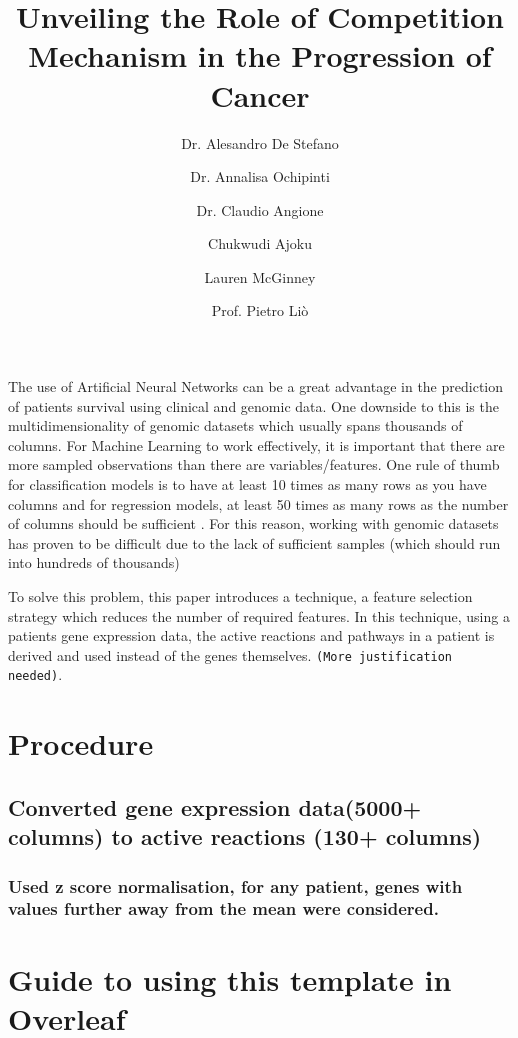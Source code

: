 \documentclass[10pt,twocolumn,twoside,lineno]{gsajnl}
\title{Unveiling the Role of Competition Mechanism in the Progression of Cancer}
\author[1, $\dagger$]{Dr. Alesandro De Stefano}
\author[2, $\dagger$]{Dr. Annalisa Ochipinti}
\author[3, $\dagger$]{Dr. Claudio Angione}
\author[4, $\dagger$]{Chukwudi Ajoku}
\author[5, $\dagger$]{Lauren McGinney}
\author[6, $\ast$]{Prof. Pietro Li\`{o}}
\affil[$\dagger$]{Teesside University}
\affil[$\ast$]{University of Cambridge}
\begin{document}
\maketitle
\thispagestyle{firststyle}
\vspace{-13pt}%

\lettrine[lines=2]{\color{color2}T}{}he use of Artificial Neural Networks can be a great advantage in the prediction of patients survival using clinical and genomic data. One downside to this is the multidimensionality of genomic datasets which usually spans thousands of columns. For Machine Learning to work effectively, it is important that there are more sampled observations than there are variables/features. One rule of thumb for classification models is to have at least 10 times as many rows as you have columns and for regression models, at least 50 times as many rows as the number of columns should be sufficient \cite{googledoc}. For this reason, working with genomic datasets has proven to be difficult due to the lack of sufficient samples (which should run into hundreds of thousands) 


To solve this problem, this paper introduces a technique, a feature selection strategy which reduces the number of required features. In this technique, using a patients gene expression data, the active reactions and pathways in a patient is derived and used instead of the genes themselves. \verb|(More justification needed)|.


\section{Procedure}
\subsection{Converted gene expression data(5000+ columns) to active reactions (130+ columns)}
\subsubsection{Used z score normalisation, for any patient, genes with values further away from the mean were considered.}

\section{Guide to using this template in Overleaf}
\end{document}
